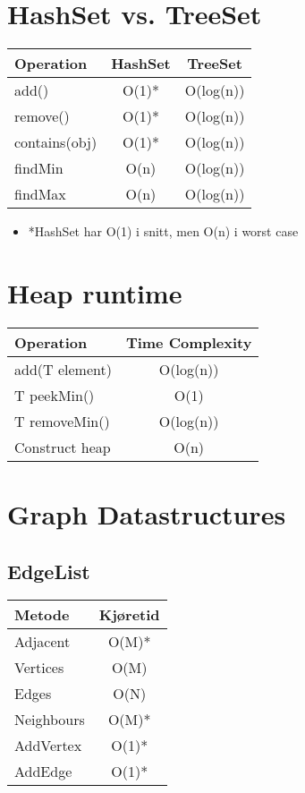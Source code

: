 \documentclass{article}
\begin{document}
\newpage


\section{HashSet vs. TreeSet}
\begin{table}[h!]
\centering
\begin{tabular}{|l|c|c|}
\hline
\textbf{Operation} & \textbf{HashSet} & \textbf{TreeSet} \\
\hline
add() & O(1)* & O(log(n)) \\
\hline
remove() & O(1)* & O(log(n)) \\
\hline
contains(obj) & O(1)* & O(log(n)) \\
\hline
findMin & O(n) & O(log(n))\\
\hline
findMax & O(n) & O(log(n))\\
\hline
\end{tabular}
\end{table}
\begin{itemize}
  \item *HashSet har O(1) i snitt, men O(n) i worst case
\end{itemize}



\section{Heap runtime}
\begin{table}[h!]
\centering
\begin{tabular}{|l|c|}
\hline
\textbf{Operation} & \textbf{Time Complexity} \\
\hline
add(T element) & O(log(n)) \\
\hline
T peekMin() & O(1) \\
\hline
T removeMin() & O(log(n)) \\
\hline
Construct heap & O(n) \\
\hline
\end{tabular}
\end{table}


\section{Graph Datastructures}
\subsection{EdgeList}
\begin{table}[h!]
\centering
\begin{tabular}{|l|c|}
\hline
\textbf{Metode} & \textbf{Kjøretid} \\
\hline
Adjacent & O(M)* \\
\hline
Vertices & O(M) \\
\hline
Edges & O(N) \\
\hline
Neighbours & O(M)* \\
\hline
AddVertex & O(1)* \\
\hline
AddEdge & O(1)* \\
\hline
\end{tabular}
\end{table}
\end{document}
